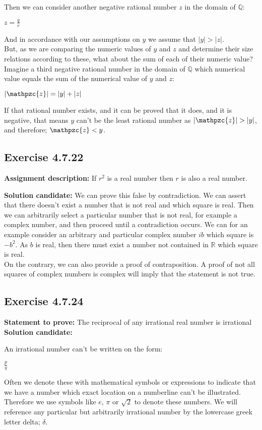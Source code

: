 \documentclass{report}
\newcommand{\cent}[1]{\begin{center}#1\end{center}}
\newcommand{\doubleR}{\mathbb{R}}
\newcommand{\doubleQ}{\mathbb{Q}}
\newcommand{\script}[1]{\mathpzc{#1}}
\newcommand{\Prove}{\textbf{Statement to prove: }}
\newcommand{\assignmentDescription}{\textbf{Assignment description: }}
\newcommand{\solution}{\textbf{Solution candidate: }}
\newcommand{\QED}{\boxed{}}
\newcommand{\Exercise}[1]{\subsection{Exercise #1}}
\begin{document}
	Then we can consider another negative rational number $z$ in the domain of $\doubleQ$:
	
	\cent{$z = \frac{q}{r}$}
	
	And in accordance with our assumptions on $y$ we assume that $|y| > |z|$.\\
	
	But, as we are comparing the numeric values of $y$ and $z$ and determine their size relations according to these, what about the sum of each of their numeric value?\\
	
	Imagine a third negative rational number in the domain of $\doubleQ$ which numerical value equals the sum of the numerical value of $y$ and $z$:
	
	\cent{$|\script{z}| = |y| + |z|$}
	
	If that rational number exists, and it can be proved that it does, and it is negative, that means $y$ can't be the least rational number as $|\script{z}| > |y|$, and therefore; $\script{z} < y$.\\
	\QED
	
	\Exercise{4.7.22}
	
	\assignmentDescription
	If $r^2$ is a real number then $r$ is also a real number.
	
	\solution
	We can prove this false by contradiction. We can assert that there doesn't exist a number that is not real and which square is real. Then we can arbitrarily select a particular number that is not real, for example a complex number, and then proceed until a contradiction occurs. We can for an example consider an arbitrary and particular complex number $ib$ which square is $-b^2$. As $b$ is real, then there must exist a number not contained in $\doubleR$ which square is real.\\
	
	On the contrary, we can also provide a proof of contraposition. A proof of not all squares of complex numbers is complex will imply that the statement is not true.\\
	
	\Exercise{4.7.24}
	
	\Prove
	The reciprocal of any irrational real number is irrational\\
	
	\solution
	
	An irrational number can't be written on the form:
	
	\cent{$\frac{p}{q}$}
	
	Often we denote these with mathematical symbols or expressions to indicate that we have a number which exact location on a numberline can't be illustrated. Therefore we use symbols like $e$, $\pi$ or $\sqrt{2}$ to denote these numbers. We will reference any particular but arbitrarily irrational number by the lowercase greek letter delta; $\delta$.\\
	
\end{document}
